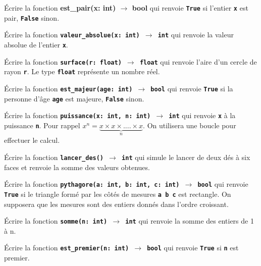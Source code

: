 \documentclass[a4paper,11pt]{article}
\begin{document}
\begin{exo}
    Écrire la fonction \textbf{est\_pair(x: int) $\rightarrow$ bool} qui renvoie \textbf{\texttt{True}} si l'entier \textbf{\texttt{x}} est pair, \textbf{\texttt{False}} sinon.
\end{exo}
\begin{exo}
    Écrire la fonction \texttt{\textbf{valeur\_absolue(x: int) $\rightarrow$ int}} qui renvoie la valeur absolue de l'entier \textbf{\texttt{x}}.
\end{exo}
\begin{exo}
    Écrire la fonction \texttt{\textbf{surface(r: float) $\rightarrow$ float}} qui renvoie l'aire d'un cercle de rayon \textbf{\texttt{r}}. Le type \textbf{\texttt{float}} représente un nombre réel.
\end{exo}
\begin{exo}
    Écrire la fonction \texttt{\textbf{est\_majeur(age: int) $\rightarrow$ bool}} qui renvoie \textbf{\texttt{True}} si la personne d'âge \textbf{\texttt{age}} est majeure, \textbf{\texttt{False}} sinon.
\end{exo}
\begin{exo}
    Écrire la fonction \texttt{\textbf{puissance(x: int, n: int) $\rightarrow$ int}} qui renvoie \textbf{\texttt{x}} à la puissance \textbf{\texttt{n}}. Pour rappel $x^n = \underbrace{x×x×....×x}_{n}$. On utilisera une boucle pour effectuer le calcul.
\end{exo}
\begin{exo}
    Écrire la fonction \textbf{\texttt{lancer\_des() $\rightarrow$ int}} qui simule le lancer de deux dés à six faces et renvoie la somme des valeurs obtenues.
    \end{exo}
\begin{exo}
    Écrire la fonction \texttt{\textbf{pythagore(a: int, b: int, c: int) $\rightarrow$ bool}} qui renvoie \textbf{\texttt{True}} si le triangle formé par les côtés de mesures \textbf{\texttt{a b c}} est rectangle. On supposera que les mesures sont des entiers donnés dans l'ordre croissant.
\end{exo}
\begin{exo}
    Écrire la fonction \textbf{\texttt{somme(n: int) $\rightarrow$ int}} qui renvoie la somme des entiers de 1 à n.
\end{exo}
\begin{exo}
    Écrire la fonction \textbf{\texttt{est\_premier(n: int) $\rightarrow$ bool}} qui renvoie \textbf{\texttt{True}} si \textbf{\texttt{n}} est premier.
\end{exo}
\end{document}
